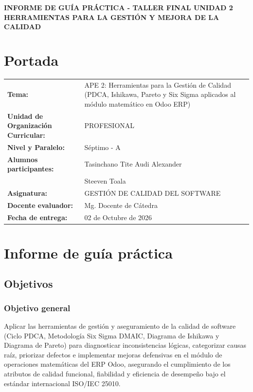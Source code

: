 \documentclass{article}
\begin{document}
\begin{center}
    {\Large \textbf{INFORME DE GUÍA PRÁCTICA - TALLER FINAL UNIDAD 2}} \\
    \vspace{0.2cm}
    {\large \textbf{HERRAMIENTAS PARA LA GESTIÓN Y MEJORA DE LA CALIDAD}}
\end{center}

\vspace{0.3cm}

\section{Portada}
\begin{flushleft}
\renewcommand{\arraystretch}{1.2}
\begin{tabular}{ p{5.5cm} p{10cm} }
    \textbf{Tema:} & APE 2: Herramientas para la Gestión de Calidad (PDCA, Ishikawa, Pareto y Six Sigma aplicados al módulo matemático en Odoo ERP) \\
    \textbf{Unidad de Organización Curricular:} & PROFESIONAL \\
    \textbf{Nivel y Paralelo:} & Séptimo - A \\
    \textbf{Alumnos participantes:} & Tasinchano Tite Audi Alexander \\
                                   & Steeven Toala \\
    \textbf{Asignatura:} & GESTIÓN DE CALIDAD DEL SOFTWARE \\
    \textbf{Docente evaluador:} & Mg. Docente de Cátedra \\
    \textbf{Fecha de entrega:} & 02 de Octubre de 2026 \\
\end{tabular}
\end{flushleft}

\vspace{0.3cm}

\section{Informe de guía práctica}

\subsection{Objetivos}
\subsubsection{Objetivo general}
Aplicar las herramientas de gestión y aseguramiento de la calidad de software (Ciclo PDCA, Metodología Six Sigma DMAIC, Diagrama de Ishikawa y Diagrama de Pareto) para diagnosticar inconsistencias lógicas, categorizar causas raíz, priorizar defectos e implementar mejoras defensivas en el módulo de operaciones matemáticas del ERP Odoo, asegurando el cumplimiento de los atributos de calidad funcional, fiabilidad y eficiencia de desempeño bajo el estándar internacional ISO/IEC 25010.
\end{document}
